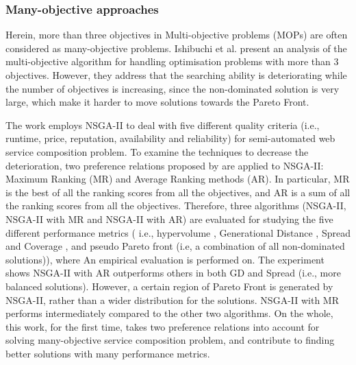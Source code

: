 \subsubsection{Many-objective approaches}\label{ManyObjective}

Herein, more than three objectives in Multi-objective problems (MOPs) are often considered as many-objective problems. Ishibuchi et al. \cite{ishibuchi2008evolutionary} present an analysis of the multi-objective algorithm for handling optimisation problems with more than 3 objectives. However, they address that the searching ability is deteriorating while the number of objectives is increasing, since the non-dominated solution is very large, which make it harder to move solutions towards the Pareto Front.

The work \cite{de2010many} employs NSGA-II to deal with five different quality criteria (i.e., runtime, price, reputation, availability and reliability) for semi-automated web service composition problem.  To examine the techniques to decrease the deterioration, two preference relations proposed by \cite{bentley1997finding} are applied to NSGA-II: Maximum Ranking (MR) and Average Ranking methods (AR). In particular, MR is the best of all the ranking scores from all the objectives, and AR is a sum of all the ranking scores from all the objectives. Therefore, three algorithms (NSGA-II, NSGA-II with MR and NSGA-II with AR) are evaluated for studying the five different performance metrics ( i.e., hypervolume \cite{zitzler1999evolutionary}, Generational Distance \cite{van2000measuring}, Spread and Coverage \cite{zitzler2000comparison}, and pseudo Pareto front (i.e, a combination of all non-dominated solutions)),  where An empirical evaluation is performed on. The experiment shows NSGA-II with AR outperforms others in both GD and Spread (i.e., more balanced solutions). However,  a certain region of  Pareto Front is generated by NSGA-II,  rather than a wider distribution for the solutions. NSGA-II with MR performs intermediately compared to the other two algorithms. On the whole,  this work, for the first time, takes two preference relations into account for solving many-objective service composition problem, and contribute to finding better solutions with many performance metrics.



